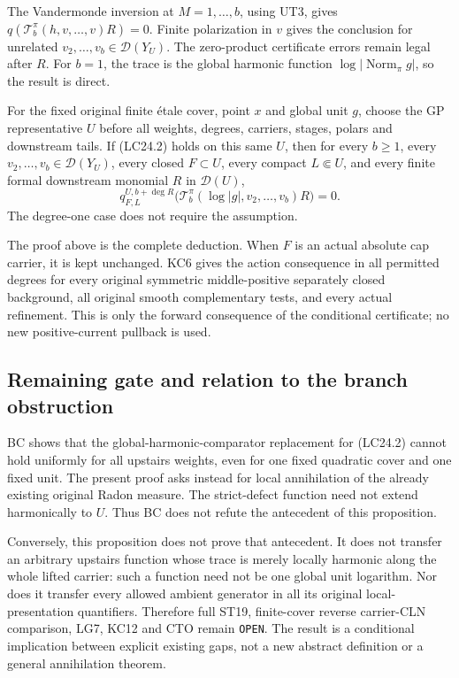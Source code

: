 The Vandermonde inversion at \(M=1,\ldots,b\), using UT3,
gives
\(q(\mathcal T_b^\pi(h,v,\ldots,v)R)=0\).
Finite polarization in \(v\) gives the conclusion for unrelated
\(v_2,\ldots,v_b\in\mathcal D(Y_U)\). The zero-product
certificate errors remain legal after \(R\).
For \(b=1\), the trace is the global harmonic function
\(\log|\operatorname{Norm}_\pi g|\), so the result is direct.

\begin{proposition}
For the fixed original finite \'{e}tale cover, point \(x\) and
global unit \(g\), choose the GP representative \(U\) before all
weights, degrees, carriers, stages, polars and downstream tails.
If (LC24.2) holds on this same \(U\), then for every \(b\ge1\),
every \(v_2,\ldots,v_b\in\mathcal D(Y_U)\), every closed
\(F\subset U\), every compact \(L\Subset U\), and every finite
formal downstream monomial \(R\) in \(\mathcal D(U)\),
\[
 q^{U,b+\deg R}_{F,L}
       \bigl(\mathcal T_b^\pi(\log|g|,v_2,\ldots,v_b)R\bigr)=0.
                                                               \tag{LC24.12}
\]
The degree-one case does not require the assumption.
\end{proposition}

The proof above is the complete deduction. When \(F\) is an
actual absolute cap carrier, it is kept unchanged. KC6 gives
the action consequence in all permitted degrees for every
original symmetric middle-positive separately closed background,
all original smooth complementary tests, and every actual
refinement. This is only the forward consequence of the
conditional certificate; no new positive-current pullback is used.

\subsection{Remaining gate and relation to the branch obstruction}

BC shows that the global-harmonic-comparator replacement for
(LC24.2) cannot hold uniformly for all upstairs weights, even
for one fixed quadratic cover and one fixed unit. The present
proof asks instead for local annihilation of the already existing
original Radon measure. The strict-defect function need not
extend harmonically to \(U\). Thus BC does not refute the
antecedent of this proposition.

Conversely, this proposition does not prove that antecedent.
It does not transfer an arbitrary upstairs function whose trace
is merely locally harmonic along the whole lifted carrier:
such a function need not be one global unit logarithm.
Nor does it transfer every allowed ambient generator in all its
original local-presentation quantifiers. Therefore full ST19,
finite-cover reverse carrier-CLN comparison, LG7, KC12 and CTO
remain \texttt{OPEN}. The result is a conditional implication
between explicit existing gaps, not a new abstract definition
or a general annihilation theorem.

